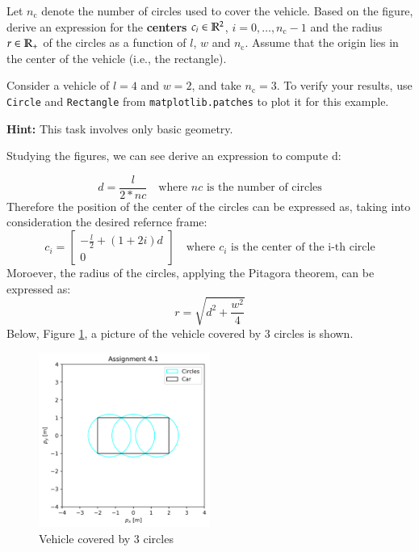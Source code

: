 \documentclass[]{article}
\begin{document}
\newcommand{\nc}{n_{\mathrm{c}}}
\begin{assignment}
	Let $\nc$ denote the number of circles used to cover the vehicle. 
	Based on the figure, derive an expression 
	for the \textbf{centers} $c_i \in \mathbb{R}^2$, $i = 0, \dots, \nc-1$ 
	and the radius $r \in \mathbb{R}_+$ of the circles
	as a function of $l$, $w$ and $\nc$. 
	Assume that the origin lies in the center of the vehicle (i.e., the rectangle).
	
	Consider a vehicle of $l=4$ and $w=2$, and take $\nc=3$. 
	To verify your results, use \texttt{Circle} and \texttt{Rectangle} from \texttt{matplotlib.patches} 
	to plot it for this example.

	\textbf{Hint:} This task involves only basic geometry.
\end{assignment}
\begin{flushleft}
	Studying the figures, we can see derive an expression to compute d:
\end{flushleft}
\[
	d = \frac{l}{2 * nc} \quad \text{where } nc \text{ is the number of circles}
\]
Therefore the position of the center of the circles can be expressed as, taking into consideration the desired refernce frame:
\[
	c_i = \begin{bmatrix}
		- \frac{l}{2} + (1 + 2i)d \\
		0
	\end{bmatrix} \quad \text{where } c_i \text{ is the center of the i-th circle}
\]
Moroever, the radius of the circles, applying the Pitagora theorem, can be expressed as:
\[
	r = \sqrt{d^2 + \frac{w^2}{4}}
\]
Below, Figure \ref{fig:assignment4_1}, a picture of the vehicle covered by 3 circles is shown.
\begin{figure}[H]
    \centering
    \includegraphics[width=0.5\textwidth]{images/Assignment 4.1.png}
    \caption{Vehicle covered by 3 circles}
    \label{fig:assignment4_1}
\end{figure}
\end{document}
